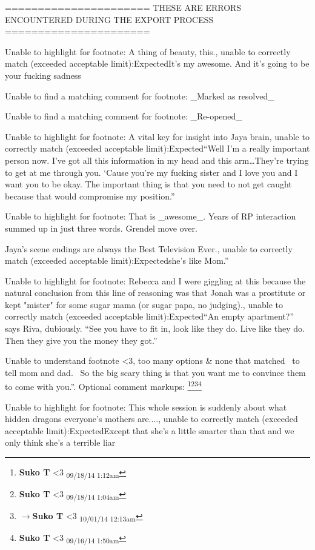 \iffalse

======================
THESE ARE ERRORS ENCOUNTERED DURING THE EXPORT PROCESS
======================

	Unable to highlight for footnote: A thing of beauty, this., unable to correctly match (exceeded acceptable limit):ExpectedIt’s my awesome.  And it’s going to be your fucking sadness

	Unable to find a matching comment for footnote: _Marked as resolved_

	Unable to find a matching comment for footnote: _Re-opened_

	Unable to highlight for footnote: A vital key for insight into Jaya brain, unable to correctly match (exceeded acceptable limit):Expected“Well I’m a really important person now.  I’ve got all this information in my head and this arm…They’re trying to get at me through you.  ‘Cause you’re my fucking sister and I love you and I want you to be okay.  The important thing is that you need to not get caught because that would compromise my position.”

	Unable to highlight for footnote: That is _awesome_.  Years of RP interaction summed up in just three words.  Grendel move over.

Jaya's scene endings are always the Best Television Ever., unable to correctly match (exceeded acceptable limit):Expectedshe’s like Mom.”

	Unable to highlight for footnote: Rebecca and I were giggling at this because the natural conclusion from this line of reasoning was that Jonah was a prostitute or kept "mister" for some sugar mama (or sugar papa, no judging)., unable to correctly match (exceeded acceptable limit):Expected“An empty apartment?” says Riva, dubiously.
“See you have to fit in, look like they do. Live like they do.  Then they give you the money they got.”

	Unable to understand footnote <3, too many options & none that matched  to tell mom and dad.  So the big scary thing is that you want me to convince them to come with you.”. Optional comment markups: \footnote{\textbf{Suko T }<3 \textsubscript{09/18/14 1:12am}}\footnote{\textbf{Suko T }<3 \textsubscript{09/18/14 1:04am}}\footnote{$\rightarrow$\textbf{Suko T }<3 \textsubscript{10/01/14 12:13am}}\footnote{\textbf{Suko T }<3 \textsubscript{09/16/14 1:50am}} 

	Unable to highlight for footnote: This whole session is suddenly about what hidden dragons everyone's mothers are...., unable to correctly match (exceeded acceptable limit):ExpectedExcept that she’s a little smarter than that and we only think she’s a terrible liar

